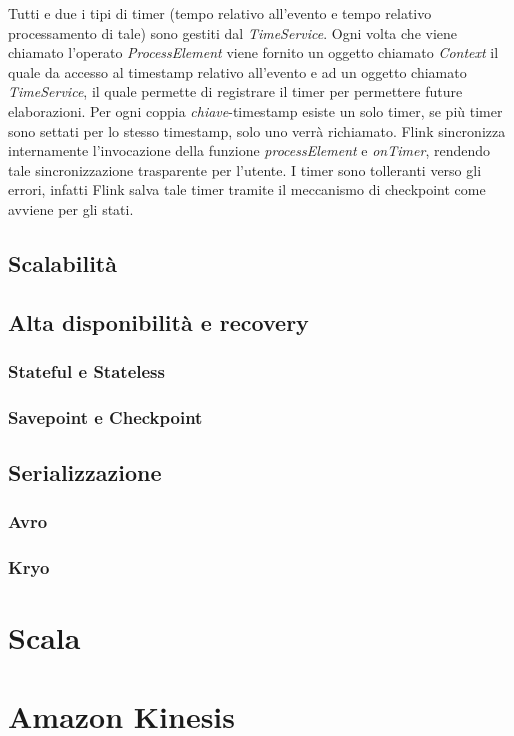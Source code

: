 \label{sec:timer}
Tutti e due i tipi di timer (tempo relativo all'evento e tempo relativo processamento di tale) sono gestiti dal \textit{TimeService}. Ogni volta che viene chiamato l'operato \textit{ProcessElement} viene fornito un oggetto chiamato \textit{Context} il quale da accesso al \gls{timestamp} relativo all'evento e ad un oggetto chiamato \textit{TimeService}, il quale permette di registrare il timer per permettere future elaborazioni. Per ogni coppia \textit{chiave}-\gls{timestamp} esiste un solo timer, se più timer sono settati per lo stesso \gls{timestamp}, solo uno verrà richiamato. Flink sincronizza internamente l'invocazione della funzione \textit{processElement} e \textit{onTimer}, rendendo tale sincronizzazione trasparente per l'utente. I timer sono tolleranti verso gli errori, infatti Flink salva tale timer tramite il meccanismo di \gls{checkpoint} come avviene per gli stati.


\subsection{Scalabilità}

\subsection{Alta disponibilità e recovery}

\subsubsection{Stateful e Stateless}

\subsubsection{Savepoint e Checkpoint}

\subsection{Serializzazione}

\subsubsection{Avro}

\subsubsection{Kryo}




\section{Scala}

\section{Amazon Kinesis}

